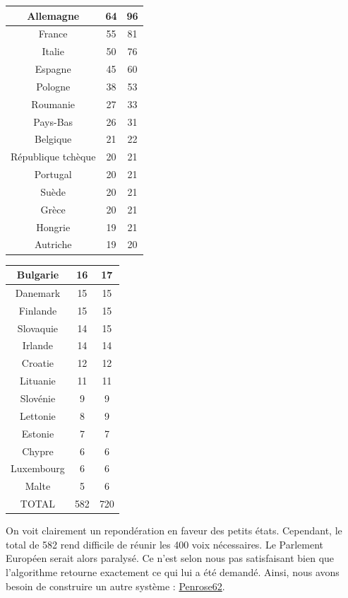 \begin{center}
	\begin{tabular}{|c|c|c|}
		\hline Allemagne & 64 & 96 \\
		\hline France & 55 & 81 \\
		\hline Italie & 50 & 76 \\
		\hline Espagne & 45 & 60 \\
		\hline Pologne & 38 & 53 \\
		\hline Roumanie & 27 & 33 \\
		\hline Pays-Bas & 26 & 31 \\
		\hline Belgique & 21 & 22 \\
		\hline République tchèque & 20 & 21 \\
		\hline Portugal & 20 & 21 \\
		\hline Suède & 20 & 21 \\
		\hline Grèce & 20 & 21 \\
		\hline Hongrie & 19 & 21 \\
		\hline Autriche & 19 & 20 \\
		\hline
	\end{tabular}
	\begin{tabular}{|c|c|c|}
		\hline Bulgarie & 16 & 17 \\
		\hline Danemark & 15 & 15 \\
		\hline Finlande & 15 & 15 \\
		\hline Slovaquie & 14 & 15 \\
		\hline Irlande & 14 & 14 \\
		\hline Croatie & 12 & 12 \\
		\hline Lituanie & 11 & 11 \\
		\hline Slovénie & 9 & 9 \\
		\hline Lettonie & 8 & 9 \\
		\hline Estonie & 7 & 7 \\
		\hline Chypre & 6 & 6 \\
		\hline Luxembourg & 6 & 6 \\
		\hline Malte & 5 & 6 \\
		\hline TOTAL & 582 & 720 \\
		\hline
	\end{tabular}
\end{center}

On voit clairement un repondération en faveur des petits états.
Cependant, le total de 582 rend difficile de réunir les 400 voix nécessaires. Le Parlement Européen serait alors paralysé. Ce n’est selon nous pas satisfaisant bien que l'algorithme retourne exactement ce qui lui a été demandé.
Ainsi, nous avons besoin de construire un autre système : \hyperlink{section.5}{Penrose62}.


